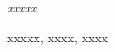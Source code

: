 \newpage 
\thispagestyle{empty}

\begin{abstractEN}
{\em
xxxxx
}

\begin{keyWordsEN}
xxxxx, xxxx, xxxx
\end{keyWordsEN}

\end{abstractEN}